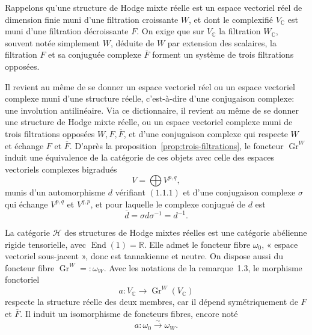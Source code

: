 \documentclass[11pt]{article}
\newcommand{\Gr}{\operatorname{Gr}}
\newcommand{\End}{\operatorname{End}}
\begin{document}
Rappelons qu'une structure de Hodge mixte réelle est un espace vectoriel réel de dimension finie muni d'une filtration croissante \(W\), et dont le complexifié \(V_\mathbb C\) est muni d'une filtration décroissante \(F\). On exige que sur \(V_\mathbb C\) la filtration \(W_\mathbb C\), souvent notée simplement \(W\), déduite de \(W\) par extension des scalaires, la filtration \(F\) et sa conjuguée complexe \(\overline F\) forment un système de trois filtrations opposées.

Il revient au même de se donner un espace vectoriel réel ou un espace vectoriel complexe muni d'une structure réelle, c'est-à-dire d'une conjugaison complexe: une involution antilinéaire. Via ce dictionnaire, il revient au même de se donner une structure de Hodge mixte réelle, ou un espace vectoriel complexe muni de trois filtrations opposées \(W,F,\overline F\), et d'une conjugaison complexe qui respecte \(W\) et échange \(F\) et \(\overline F\). D'après la proposition~\ref{prop:trois-filtrations}, le foncteur \(\Gr^W\) induit une équivalence de la catégorie de ces objets avec celle des espaces vectoriels complexes bigradués
\[
 V=\bigoplus V^{p,q},
\]
munis d'un automorphisme \(d\) vérifiant \((1.1.1)\) et d'une conjugaison complexe \(\sigma\) qui échange \(V^{p,q}\) et \(V^{q,p}\), et pour laquelle le complexe conjugué de \(d\) est
\[
 \overline d=\sigma d\sigma^{-1}=d^{-1}.
\]

La catégorie \(\mathcal H\) des structures de Hodge mixtes réelles est une catégorie abélienne rigide tensorielle, avec \(\End(1)=\mathbb R\). Elle admet le foncteur fibre \(\omega_0\), « espace vectoriel sous-jacent », donc est tannakienne et neutre. On dispose aussi du foncteur fibre \(\Gr^W=:\omega_W\). Avec les notations de la remarque~1.3, le morphisme fonctoriel
\[
 a:V_\mathbb C\longrightarrow \Gr^W(V_\mathbb C)
\]
respecte la structure réelle des deux membres, car il dépend symétriquement de \(F\) et \(\overline F\). Il induit un isomorphisme de foncteurs fibres, encore noté
\[
 a:\omega_0\xrightarrow{\sim}\omega_W.
\]
\end{document}

